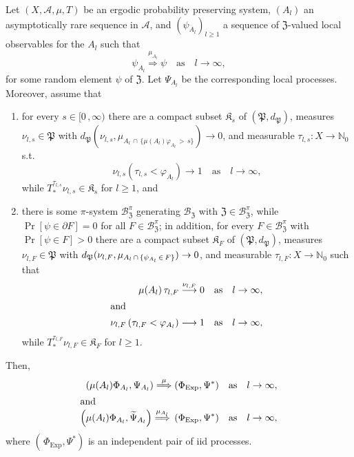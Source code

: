 \documentclass[AHL,Unicode,longabstracts]{cedram}
\newcommand{\clA}{\mathcal{A}}
\newcommand{\clB}{\mathcal{B}}
\newcommand{\Expl}{\mathrm{Exp}}
\newcommand{\frkK}{\mathfrak{K}}
\newcommand{\frkP}{\mathfrak{P}}
\newcommand{\frkZ}{\mathfrak{Z}}
\newcommand{\bbN}{\mathbb{N}}
\newcommand*{\Alphenumi}{\renewcommand*{\theenumi}{\Alph{enumi}}}
\begin{document}
\begin{theo}\label{T_SpatiotemporalIIDLimits}
Let $(X,\clA,\mu,T)$ be an ergodic probability preserving system, $(A_{l})$ an asymptotically rare sequence in $\clA$, and $(\psi_{A_{l}})_{l\geq 1}$ a sequence of $\frkZ$-valued local observables for the $A_{l}$ such that
\begin{equation}
\psi_{A_{l}}\overset{\mu_{A_{l}}}{\Longrightarrow}\psi\quad\text{as}\quad l\rightarrow\infty,
\end{equation}
for some random element $\psi$ of $\frkZ$. Let $\Psi_{A_{l}}$ be the corresponding local processes. Moreover, assume that
\begin{enumerate}\Alphenumi
\item\label{theo 5.3.A} for every $s\in\lbrack0\,,\infty)$ there are a compact subset $\frkK_{s}$ of $(\frkP,d_{\frkP})$, measures $\nu _{l,s}\in\frkP$ with $d_{\frkP}(\nu_{l,s},\mu_{A_{l}\,\cap
\,\{\mu(A_{l})\varphi_{A_{l}}\,>\,s\}})\rightarrow0$, and measurable $\tau _{l,s}:X\rightarrow\bbN_{0}$ s.t.
\begin{equation}\label{Eq_xdrxrxxdxrxdrxd}
\nu_{l,s}\left(\tau_{l,s}<\varphi_{A_{l}}\right) \longrightarrow 1\quad\text{as}\quad l\rightarrow\infty, 
\end{equation}
while $T_{\ast}^{\tau_{l,s}}\nu_{l,s}\in\frkK_{s}$ for $l\geq1$, and

\item\label{theo 5.3.B} there is some $\pi$-system $\clB_{\frkZ}^{\pi}$ generating $\clB_{\frkZ}$ with $\frkZ\in\clB _{\frkZ}^{\pi}$, while $\Pr[\psi\in\partial F]=0$ for all $F\in\clB_{\frkZ}^{\pi}$; in addition, for every $F\in
\clB_{\frkZ}^{\pi}$ with $\Pr[\psi\in F]>0$ there are a compact subset $\frkK_{F}$ of $(\frkP,d_{\frkP})$, measures $\nu_{l,F}\in\frkP$ with $d_{\frkP}(\nu_{l,F},\mu_{A_{l}
\,\cap\,\{\psi_{A_{l}}\,\in\,F\}})\linebreak\rightarrow0$, and measurable $\tau_{l,F} :X\rightarrow\bbN_{0}$ such that
\begin{align}
\mu(A_{l})\,\tau_{l,F}\overset{\nu_{l,F}}{\longrightarrow}0\quad &\text{as}\quad l\rightarrow\infty, \label{Eq_vzgvzgvzgvzgvzgv1}
\\
\intertext{and}
\nu_{l,F}\left(\tau_{l,F}<\varphi_{A_{l}}\right) \longrightarrow 1\quad &\text{as}\quad l\rightarrow\infty, \label{Eq_owowowowowoowwowowow}
\end{align}
while $T_{\ast}^{\tau_{l,F}}\nu_{l,F}\in\frkK_{F}$ for $l\geq 1$.
\end{enumerate}

Then,
\begin{align}
\left(\mu(A_{l})\Phi_{A_{l}},\Psi_{A_{l}}\right)\overset{\mu}{\Longrightarrow} \left(\Phi_{\Expl},\Psi^{\ast}\right)\quad &\text{as}\quad l\rightarrow\infty,
\\
\intertext{and}
\left(\mu(A_{l})\Phi_{A_{l}},\widetilde{\Psi}_{A_{l}}\right)\overset{\mu_{A_{l}}}{\Longrightarrow}\,\left(\Phi_{\Expl},\Psi^{\ast}\right)\quad &\text{as}\quad l\rightarrow\infty,\label{Eq_qdqdqdqdqd}
\end{align}
where $(\,\Phi_{\Expl},\Psi^{\ast})$ is an independent pair of iid processes.
\end{theo}
\end{document}
